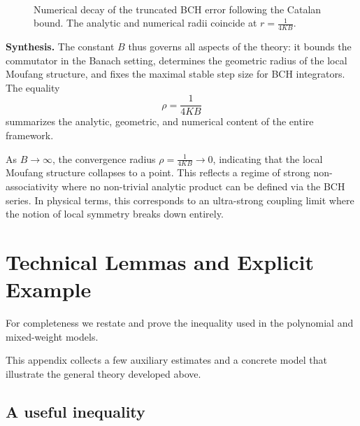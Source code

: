 \documentclass[11pt]{amsart}
\numberwithin{equation}{section}
\theoremstyle{remark}
\newcommand{\BCH}{\operatorname{BCH}}
\begin{document}
\begin{figure}[htbp]
\centering
{}
\caption{Numerical decay of the truncated BCH error following the Catalan bound. The analytic and numerical radii coincide at $r=\frac{1}{4KB}$.}~\label{fig:truncation-error}
\end{figure}

\medskip
\noindent\textbf{Synthesis.}
The constant $B$ thus governs all aspects of the theory:
it bounds the commutator in the Banach setting, determines the geometric radius of the local Moufang structure, and fixes the maximal stable step size for BCH integrators.
The equality
\[
 \rho=\frac{1}{4KB}
\]
summarizes the analytic, geometric, and numerical content of the entire framework.

As $B \to \infty$, the convergence radius $\rho = \frac{1}{4KB} \to 0$, indicating that the local Moufang structure collapses to a point. This reflects a regime of strong non-associativity where no non-trivial analytic product can be defined via the BCH series. In physical terms, this corresponds to an ultra-strong coupling limit where the notion of local symmetry breaks down entirely.

\appendix
\renewcommand{\thesection}{A}
\section{Technical Lemmas and Explicit Example}
\renewcommand{\thetheorem}{A.\arabic{theorem}}
\renewcommand{\theproposition}{A.\arabic{proposition}}
\renewcommand{\thelemma}{A.\arabic{lemma}}
\setcounter{theorem}{0}

For completeness we restate and prove the inequality used in the polynomial and mixed-weight models.

This appendix collects a few auxiliary estimates and a concrete model that illustrate the general theory developed above.

\subsection{A useful inequality}
\end{document}
